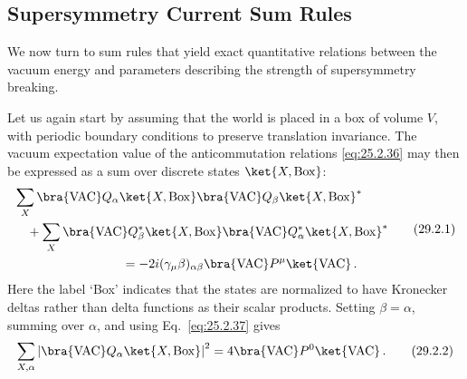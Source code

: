 
\subsection{Supersymmetry Current Sum Rules}

We now turn to sum rules that yield exact quantitative relations between
the vacuum energy and parameters describing the strength of supersymmetry
breaking.

Let us again start by assuming that the world is placed in a box of volume
\(V\), with periodic boundary conditions to preserve translation
invariance. The vacuum expectation value of the anticommutation relations
\eqref{eq:25.2.36} may then be expressed as a sum over discrete states
\(\ket{X,\mathrm{Box}}\):
\begin{equation}
  \begin{aligned}
  &\sum_X
    \bra{\mathrm{VAC}} Q_\alpha\ket{X,\mathrm{Box}}
    \bra{\mathrm{VAC}} Q_\beta\ket{X,\mathrm{Box}}^*
  \\
  &\quad
  +\sum_X
    \bra{\mathrm{VAC}} Q_\beta^*\ket{X,\mathrm{Box}}
    \bra{\mathrm{VAC}} Q_\alpha^*\ket{X,\mathrm{Box}}^*
  \\
  &\hspace{30mm}
  =-2i(\gamma_\mu\beta)_{\alpha\beta}
    \bra{\mathrm{VAC}} P^\mu\ket{\mathrm{VAC}}\,.
  \end{aligned}
  \tag{29.2.1}\label{eq:29.2.1}
\end{equation}
Here the label `Box' indicates that the states are normalized to have
Kronecker deltas rather than delta functions as their scalar products.
Setting \(\beta=\alpha\), summing over \(\alpha\), and using
Eq.~\eqref{eq:25.2.37} gives
\begin{equation}
  \sum_{X,\alpha}
  \left\lvert
    \bra{\mathrm{VAC}} Q_\alpha\ket{X,\mathrm{Box}}
  \right\rvert^2
  =4\bra{\mathrm{VAC}} P^0\ket{\mathrm{VAC}}\,.
  \tag{29.2.2}\label{eq:29.2.2}
\end{equation}

